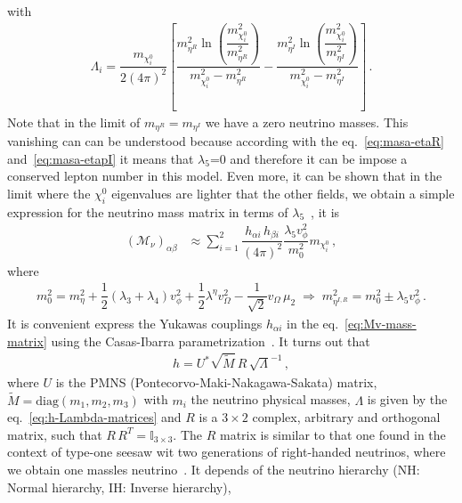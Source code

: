 \documentclass[12pt,letterpaper]{article}
\begin{document}
%
with
\begin{align}
\label{eq:Lambdai-definition}
\Lambda_i = \dfrac{m_{\chi_i^0}}{2(4\pi)^2}
\left[
\dfrac{m_{\eta^R}^2\ln\left(\dfrac{m_{\chi_i^0}^2}{m_{\eta^R}^2}\right)}{m_{\chi_i^0}^2-m_{\eta^R}^2}
-\dfrac{m_{\eta^I}^2\ln\left(\dfrac{m_{\chi_i^0}^2}{m_{\eta^I}^2}\right)}{m_{\chi_i^0}^2-m_{\eta^I}^2}
\right] \,.
\end{align}
%
Note that in the limit of $m_{\eta^R}= m_{\eta^I}$ we have a zero neutrino masses. This vanishing can can be understood because according with the eq.~\ref{eq:masa-etaR} and~\ref{eq:masa-etapI} it means that $\lambda_5$=0 and therefore it can be impose a conserved lepton number in this model. Even more, it can be shown that in the limit where the $\chi_i^0$ eigenvalues are lighter that the other fields, we obtain a simple expression for the neutrino mass matrix in terms of $\lambda_5$~\cite{Hirsch:2013ola}, it is
%
\begin{align}
\label{eq:Mv-aproximations}
(\mathcal{M}_\nu)_{\alpha\beta} &\approx \sum_{i=1}^2\dfrac{h_{\alpha i}\,h_{\beta i}}{(4\pi)^2}
\dfrac{\lambda_5 v_{\phi}^2}{m_0^2}
m_{\chi_i^0}\,,
\end{align}  
%
where 
\begin{align}
\label{ec_mo-definition}
m_0^2 = m_{\eta}^2 + \dfrac{1}{2}\left(\lambda_3+\lambda_4\right) v_{\phi}^2
+ \dfrac{1}{2}\lambda^{\eta}v_{\Omega}^2 - \dfrac{1}{\sqrt{2}}v_{\Omega}\,\mu_2\;
 \Rightarrow \;
 m_{\eta^{I,R}}^2 =m_0^2\pm\lambda_5 v_{\phi}^2\,.
\end{align}
%
It is convenient express the Yukawas couplings $h_{\alpha i}$ in the eq.~\ref{eq:Mv-mass-matrix} using the Casas-Ibarra parametrization~\cite{Casas:2001sr, Ibarra:2003up}. It turns out that
%
\begin{align}
h = U^*\sqrt{\widetilde{M}}\,R\,\sqrt{\Lambda}^{-1}\,, 
\end{align}
%
where $U$ is the PMNS (Pontecorvo-Maki-Nakagawa-Sakata) matrix, $\widetilde{M}=\text{diag}(m_1,m_2,m_3)$ with $m_i$ the neutrino physical masses, $\Lambda$ is given by the eq.~\ref{eq:h-Lambda-matrices} and $R$ is a $3\times 2$ complex, arbitrary and orthogonal matrix, such that $R\,R^T=\mathbb{I}_{3\times3}$. The $R$ matrix is similar to that one found in the context of type-one seesaw wit two generations of right-handed neutrinos, where we obtain one massles neutrino~\cite{Ibarra:2003up}. It depends of the neutrino hierarchy (NH: Normal hierarchy, IH: Inverse hierarchy),
%
\end{document}
